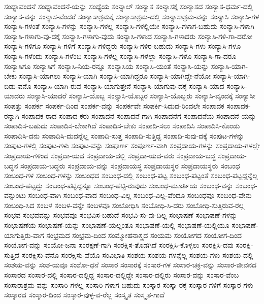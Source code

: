 {ಸಂಧ್ಯಾವಂದನೆ
ಸಂಧ್ಯಾವಂದನೆ-ಯನ್ನು
ಸಂಧ್ಯೆಯ
ಸಂನ್ಯಾಲ್
ಸಂನ್ಯಾಸ
ಸಂನ್ಯಾಸಕ್ಕೆ
ಸಂನ್ಯಾಸದ
ಸಂನ್ಯಾಸ-ಧರ್ಮ-ದಲ್ಲಿ
ಸಂನ್ಯಾಸ-ವನ್ನು
ಸಂನ್ಯಾಸ-ವೆಂದರೆ
ಸಂನ್ಯಾಸಾಶ್ರಮಕ್ಕೆ
ಸಂನ್ಯಾಸಾಶ್ರಮ-ದಲ್ಲಿ
ಸಂನ್ಯಾಸಾಶ್ರಮ-ವನ್ನು
ಸಂನ್ಯಾಸಿ
ಸಂನ್ಯಾಸಿ-ಗಳ
ಸಂನ್ಯಾಸಿ-ಗಳಂತೆ
ಸಂನ್ಯಾಸಿ-ಗಳನ್ನು
ಸಂನ್ಯಾಸಿ-ಗಳಲ್ಲ
ಸಂನ್ಯಾಸಿ-ಗಳಲ್ಲಿಯೇ
ಸಂನ್ಯಾಸಿ-ಗಳಾಗ-ಬಹುದು
ಸಂನ್ಯಾಸಿ-ಗಳಾಗಿ
ಸಂನ್ಯಾಸಿ-ಗಳಾಗು-ವು-ದಕ್ಕೆ
ಸಂನ್ಯಾಸಿ-ಗಳಾಗು-ವುದು
ಸಂನ್ಯಾಸಿ-ಗಳಾದ
ಸಂನ್ಯಾಸಿ-ಗಳಾದರು
ಸಂನ್ಯಾಸಿ-ಗಳಿ-ಗಾ-ದರೋ
ಸಂನ್ಯಾಸಿ-ಗಳಿಗೂ
ಸಂನ್ಯಾಸಿ-ಗಳಿಗೆ
ಸಂನ್ಯಾಸಿ-ಗಳಿದ್ದರು
ಸಂನ್ಯಾಸಿ-ಗಳಿರ-ಬಹುದು
ಸಂನ್ಯಾಸಿ-ಗಳು
ಸಂನ್ಯಾಸಿ-ಗಳೂ
ಸಂನ್ಯಾಸಿ-ಗಳೆಂದು
ಸಂನ್ಯಾಸಿ-ಗಳೆಂಬ
ಸಂನ್ಯಾಸಿ-ಗಳೆಲ್ಲ
ಸಂನ್ಯಾಸಿ-ಗಳೆಲ್ಲಾ
ಸಂನ್ಯಾಸಿ-ಗಳೊ
ಸಂನ್ಯಾಸಿ-ಗಾ-ದರೂ
ಸಂನ್ಯಾಸಿಗೂ
ಸಂನ್ಯಾಸಿಗೆ
ಸಂನ್ಯಾಸಿ-ನಿಯ-ರನ್ನೂ
ಸಂನ್ಯಾಸಿಯ
ಸಂನ್ಯಾಸಿ-ಯಂತೆ
ಸಂನ್ಯಾಸಿ-ಯನ್ನು
ಸಂನ್ಯಾಸಿ-ಯಾಗ-ಬೇಕು
ಸಂನ್ಯಾಸಿ-ಯಾಗಲು
ಸಂನ್ಯಾಸಿ-ಯಾಗಿ
ಸಂನ್ಯಾಸಿ-ಯಾಗಿದ್ದರೂ
ಸಂನ್ಯಾಸಿ-ಯಾಗಿದ್ದೇ-ನೆಯೋ
ಸಂನ್ಯಾಸಿ-ಯಾಗಿ-ಬಿಡು-ವನೊ
ಸಂನ್ಯಾಸಿ-ಯಾಗಿ-ರುವ
ಸಂನ್ಯಾಸಿ-ಯಾಗುತ್ತೇನೆ
ಸಂನ್ಯಾಸಿ-ಯಾಗುವು-ದಕ್ಕೆ
ಸಂನ್ಯಾಸಿ-ಯಾದ
ಸಂನ್ಯಾಸಿ-ಯಾದರು
ಸಂನ್ಯಾಸಿ-ಯಾದರೆ
ಸಂನ್ಯಾಸಿ-ಯೊಬ್ಬ
ಸಂನ್ಯಾಸಿ-ಯೊಬ್ಬರ
ಸಂನ್ಯಾಸಿ-ಯೊಬ್ಬರು
ಸಂನ್ಯಾಸಿ-ವೃಂದಕ್ಕೆ
ಸಂನ್ಯಾಸೀ
ಸಂಪತ್ತು
ಸಂಪರ್ಕ
ಸಂಪರ್ಕ-ದಿಂದ
ಸಂಪರ್ಕ-ವನ್ನು
ಸಂಪರ್ಕವೇ
ಸಂಪರ್ಕಿ-ಸಿದುದ-ರಿಂದಲೇ
ಸಂಪಾದಕ
ಸಂಪಾದಕ-ರನ್ನಾಗಿ
ಸಂಪಾದಕ-ರಾದ
ಸಂಪಾದ-ಕರು
ಸಂಪಾದನೆ
ಸಂಪಾದನೆ-ಗಾಗಿ
ಸಂಪಾದನೆಗೆ
ಸಂಪಾದನೆಯ
ಸಂಪಾದನೆ-ಯನ್ನು
ಸಂಪಾದಿಸ-ಬಹುದು
ಸಂಪಾದಿಸ-ಬೇಕಾಗಿದೆ
ಸಂಪಾದಿಸ-ಬೇಕು
ಸಂಪಾದಿ-ಸಲು
ಸಂಪಾದಿಸಿ
ಸಂಪಾದಿಸಿ-ಕೊಂಡು
ಸಂಪಾದಿಸಿ-ದನು
ಸಂಪಾದಿಸಿ-ದುದನ್ನೆಲ್ಲ
ಸಂಪಾದಿ-ಸುತ್ತ
ಸಂಪಾದಿ-ಸುತ್ತಿದ್ದ
ಸಂಪಾದಿ-ಸುವು-ದಕ್ಕೆ
ಸಂಪುಟ-ಗಳನ್ನು
ಸಂಪುಟ-ಗಳಲ್ಲಿ
ಸಂಪುಟ-ಗಳು
ಸಂಪುಟ-ವನ್ನು
ಸಂಪೂರ್ಣ
ಸಂಪೂರ್ಣ-ವಾಗಿ
ಸಂಪ್ರದಾಯ-ಗಳನ್ನು
ಸಂಪ್ರದಾಯ-ಗಳಲ್ಲೇ
ಸಂಪ್ರದಾಯ-ಗಳಿಂದ
ಸಂಪ್ರದಾ-ಯದ
ಸಂಪ್ರದಾಯ-ದಲ್ಲಿ
ಸಂಪ್ರದಾ-ಯದ-ವರು
ಸಂಪ್ರದಾಯ-ಬದ್ಧ
ಸಂಪ್ರದಾಯ-ಬದ್ಧನ
ಸಂಪ್ರದಾಯ-ಬದ್ಧರು
ಸಂಪ್ರದಾಯ-ವನ್ನು
ಸಂಪ್ರದಾಯಸ್ಥ
ಸಂಪ್ರದಾಯಸ್ಥರ
ಸಂಪ್ರದಾಯಸ್ಥರು
ಸಂಬಂಧ
ಸಂಬಂಧ-ಗಳ
ಸಂಬಂಧ-ಗಳನ್ನು
ಸಂಬಂಧದ
ಸಂಬಂಧ-ದಲ್ಲಿ
ಸಂಬಂಧ-ಪಟ್ಟ
ಸಂಬಂಧ-ಪಟ್ಟಂತೆ
ಸಂಬಂಧ-ಪಟ್ಟದ್ದನ್ನೆಲ್ಲ
ಸಂಬಂಧ-ಪಟ್ಟದ್ದು
ಸಂಬಂಧ-ಪಟ್ಟಿದ್ದನ್ನೂ
ಸಂಬಂಧ-ಪಟ್ಟಿ-ರುವುದು
ಸಂಬಂಧ-ಮೂರ್ತಿಯ
ಸಂಬಂಧ-ವನ್ನು
ಸಂಬಂಧ-ವನ್ನುಂಟು
ಸಂಬಂಧ-ವಾಗಿ
ಸಂಬಂಧ-ವಾದ
ಸಂಬಂಧ-ವಿಲ್ಲ
ಸಂಬಂಧ-ವಿಲ್ಲ-ವೆಂದೂ
ಸಂಬಂಧವೂ
ಸಂಬಂಧ-ವೇನು
ಸಂಬಂಧಿ-ಸಿದ
ಸಂಬಳ
ಸಂಬಳ-ವನ್ನೇ
ಸಂಬಳವೂ
ಸಂಬೋಧಿಸಿ
ಸಂಬೋಧಿ-ಸಿ-ದರು
ಸಂಬೋಧಿ-ಸುತ್ತಿರುವ-ರಲ್ಲ
ಸಂಭವ
ಸಂಭವವನ್ನು
ಸಂಭವವೂ
ಸಂಭವಿಸ-ಬಹುದೆ
ಸಂಭವಿ-ಸು-ವು-ದಿಲ್ಲ
ಸಂಭಾಷಣೆ
ಸಂಭಾಷಣೆ-ಗಳನ್ನು
ಸಂಭಾಷಣೆಯ
ಸಂಭಾಷಣೆ-ಯನ್ನು
ಸಂಭಾಷಣೆ-ಯಲ್ಲಂತೂ
ಸಂಭಾಷಣೆ-ಯಲ್ಲಿ
ಸಂಭಾಷಣೆ-ಯಲ್ಲಿಯೂ
ಸಂಭಾಷಣೆ-ಯಾಗುತ್ತಿರು-ವಾಗ
ಸಂಭ್ರಮದ
ಸಂಭ್ರಮ-ದಿಂದ
ಸಂಮ್ಮೋಹನಾಸ್ತ್ರದ
ಸಂಯಮ
ಸಂಯೋಗದ
ಸಂಯೋಗ-ದಿಂದ
ಸಂಯೋಗ-ವನ್ನು
ಸಂಯೋ-ಜನಾ
ಸಂರಕ್ಷಣೆ-ಗಾಗಿ
ಸಂರಕ್ಷಿಸ-ತೊಡಗಿದೆ
ಸಂರಕ್ಷಿಸಿ-ಕೊಳ್ಳಲು
ಸಂರಕ್ಷಿಸಿ-ದವು
ಸಂರಕ್ಷಿ-ಸುತ್ತಿದೆ
ಸಂರಕ್ಷಿಸು-ವೆನೊ
ಸಂರಕ್ಷಿಸು-ವೆಯೊ
ಸಂವಿಭಾತಿ
ಸಂಶಯ
ಸಂಶಯ-ಗಳನ್ನೆಲ್ಲ
ಸಂಶಯ-ಗಳು
ಸಂಶಯ-ದಲ್ಲಿ
ಸಂಶಯ-ವನ್ನು
ಸಂಶ-ಯವೂ
ಸಂಶೋ-ಧನೆ
ಸಂಸಾರ
ಸಂಸಾರಕ್ಕೆ
ಸಂಸಾರ-ಗಳ
ಸಂಸಾರ-ಚಕ್ರ-ವನ್ನು
ಸಂಸಾರ-ಜೀವನದ
ಸಂಸಾರದ
ಸಂಸಾರ-ದಲ್ಲಿ
ಸಂಸಾರ-ದಲ್ಲಿದ್ದ
ಸಂಸಾರ-ದಲ್ಲಿದ್ದೇ
ಸಂಸಾರ-ದಲ್ಲಿರು
ಸಂಸಾರ-ವನ್ನು
ಸಂಸಾರ-ವೆಂಬ
ಸಂಸಾರಾಶ್ರಮ-ವನ್ನು
ಸಂಸಾರಿ-ಗಳಲ್ಲ
ಸಂಸಾರಿ-ಗಳಾಗ-ಬಹುದು
ಸಂಸ್ಕಾರ
ಸಂಸ್ಕಾ-ರಕ್ಕೆ
ಸಂಸ್ಕಾರ-ಗಳಿಗೆ
ಸಂಸ್ಕಾರ-ಗಳು
ಸಂಸ್ಕಾರದ
ಸಂಸ್ಕಾರ-ದಿಂದ
ಸಂಸ್ಕಾರ-ವುಳ್ಳ-ವ-ರೆಲ್ಲ
ಸಂಸ್ಕೃತ
ಸಂಸ್ಕೃತ-ಗಾದೆ
}
